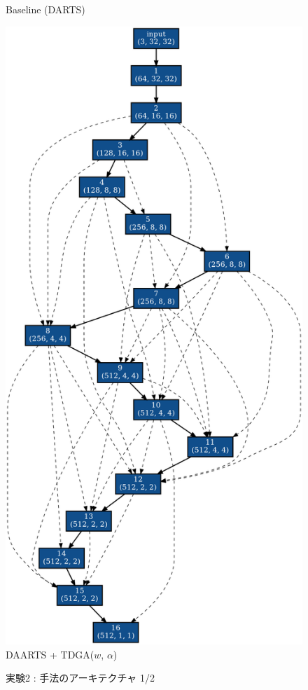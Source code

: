 \begin{figure}[tb]
\begin{minipage}{0.49\hsize}
\begin{center}
    Baseline (DARTS)
 	\end{center}
 \end{minipage}
 \begin{minipage}{0.49\hsize}
 	\begin{center}
    \includegraphics[clip,scale=0.2]{./fig/04.exp/nofix_last.png}\\
    DAARTS + TDGA($w$, $\alpha$)
 	\end{center}
 \end{minipage}
 \caption{実験2 : 手法のアーキテクチャ 1/2}
 \label{fig:exp2/archi}
\end{figure}

